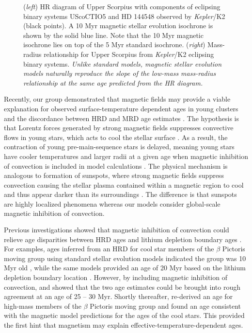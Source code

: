 \begin{figure}
    \caption{({\it left}) HR diagram of Upper Scorpius with components of eclipsing binary systems UScoCTIO5 \citep{Kraus2015} and HD 144548 \citep{Alonso2015}
    observed by {\it Kepler}/K2 (black points). A 10 Myr magnetic stellar evolution isochrone is shown by the solid blue line. Note that the 10 Myr magnetic isochrone lies on top of the 5 Myr standard isochrone. ({\it right}) Mass-radius relationship for Upper Scorpius from {\it Kepler}/K2 eclipsing binary systems. {\it Unlike standard models, magnetic stellar evolution models naturally reproduce the slope of the low-mass mass-radius relationship at the same age predicted from the HR diagram.}}
    \label{fig:usco}
    \vspace{-0.2in}
\end{figure}

Recently, our group demonstrated that magnetic fields may provide a viable explanation for observed surface-temperature dependent ages in young clusters and the discordance between HRD and MRD age estimates \citep[see Figure~\ref{fig:usco};][]{Feiden2016}. The hypothesis is that Lorentz forces generated by strong magnetic fields suppresses convective flows in young stars, which acts to cool the stellar surface \citep[e.g.,][]{DAntona2000, MM01, FC12b}. As a result, the contraction of young pre-main-sequence stars is delayed, meaning young stars have cooler temperatures and larger radii at a given age when magnetic inhibition of convection is included in model calculations \citep{MM10, Feiden2016}. The physical mechanism is analogous to formation of sunspots, where strong magnetic fields suppress convection causing the stellar plasma contained within a magnetic region to cool and thus appear darker than its surroundings \citep{Biermann1941, Deinzer1965}. The difference is that sunspots are highly localized phenomena whereas our models consider global-scale magnetic inhibition of convection. 

Previous investigations showed that magnetic inhibition of convection could relieve age disparities between HRD ages and lithium depletion boundary ages \citep{DAntona2000}. For examples, ages inferred from an HRD for cool star members of the $\beta$ Pictoris moving group using standard stellar evolution models indicated the group was 10 Myr old \citep{Zuckerman2001}, while the same models provided an age of 20 Myr based on the lithium depletion boundary location \citep{Song2002, Binks2014}. However, by including magnetic inhibition of convection, \citet{MM10} and \citet{Malo2014} showed that the two age estimates could be brought into rough agreement at an age of 25 -- 30 Myr. Shortly thereafter, \citet{Mamajek2014} re-derived an age for high-mass members of the $\beta$ Pictoris moving group and found an age consistent with the magnetic model predictions for the ages of the cool stars. This provided the first hint that magnetism may explain effective-temperature-dependent ages.


